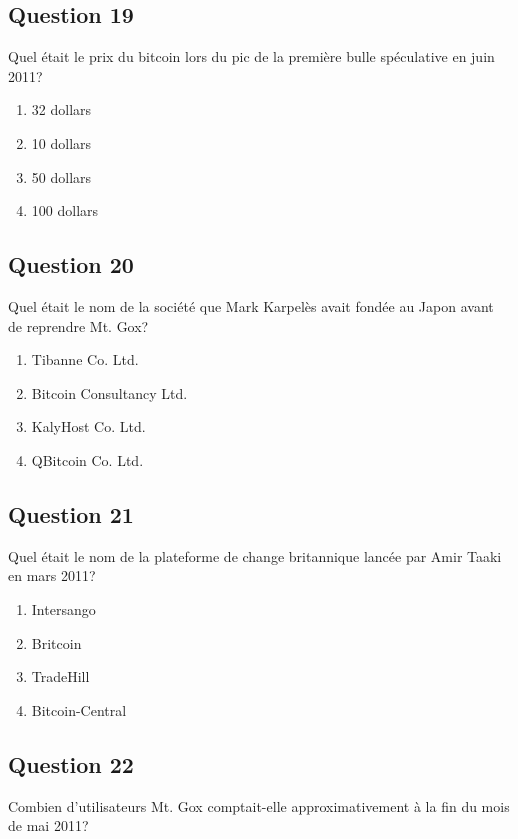 \documentclass[12pt,a4paper]{article}
\begin{document}
\bigskip


\subsection*{Question 19}
Quel était le prix du bitcoin lors du pic de la première bulle spéculative en juin 2011?

\begin{enumerate}[label=\Alph*., leftmargin=*]
\item 32 dollars
\item 10 dollars
\item 50 dollars
\item 100 dollars
\end{enumerate}

\bigskip


\subsection*{Question 20}
Quel était le nom de la société que Mark Karpelès avait fondée au Japon avant de reprendre Mt. Gox?

\begin{enumerate}[label=\Alph*., leftmargin=*]
\item Tibanne Co. Ltd.
\item Bitcoin Consultancy Ltd.
\item KalyHost Co. Ltd.
\item QBitcoin Co. Ltd.
\end{enumerate}

\bigskip


\subsection*{Question 21}
Quel était le nom de la plateforme de change britannique lancée par Amir Taaki en mars 2011?

\begin{enumerate}[label=\Alph*., leftmargin=*]
\item Intersango
\item Britcoin
\item TradeHill
\item Bitcoin-Central
\end{enumerate}

\bigskip


\subsection*{Question 22}
Combien d'utilisateurs Mt. Gox comptait-elle approximativement à la fin du mois de mai 2011?
\end{document}
